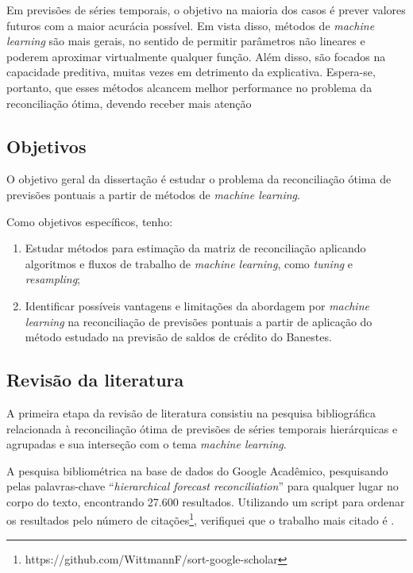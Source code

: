 \documentclass[
  12pt,
  oneside,
  a4paper,
  chapter=TITLE,
  section=TITLE,
  brazil]{abntex2}
\providecommand{\tightlist}{%
  \setlength{\itemsep}{0pt}\setlength{\parskip}{0pt}}\usepackage{longtable,booktabs,array}
\begin{document}
Em previsões de séries temporais, o objetivo na maioria dos casos é
prever valores futuros com a maior acurácia possível. Em vista disso,
métodos de \emph{machine learning} são mais gerais, no sentido de
permitir parâmetros não lineares e poderem aproximar virtualmente
qualquer função. Além disso, são focados na capacidade preditiva, muitas
vezes em detrimento da explicativa. Espera-se, portanto, que esses
métodos alcancem melhor performance no problema da reconciliação ótima,
devendo receber mais atenção

\hypertarget{objetivos}{%
\subsection{Objetivos}\label{objetivos}}

O objetivo geral da dissertação é estudar o problema da reconciliação
ótima de previsões pontuais a partir de métodos de \emph{machine
learning}.

Como objetivos específicos, tenho:

\begin{enumerate}
\def\labelenumi{\arabic{enumi}.}
\tightlist
\item
  Estudar métodos para estimação da matriz de reconciliação aplicando
  algoritmos e fluxos de trabalho de \emph{machine learning}, como
  \emph{tuning} e \emph{resampling};
\item
  Identificar possíveis vantagens e limitações da abordagem por
  \emph{machine learning} na reconciliação de previsões pontuais a
  partir de aplicação do método estudado na previsão de saldos de
  crédito do Banestes.
\end{enumerate}

\hypertarget{revisuxe3o-da-literatura}{%
\subsection{Revisão da literatura}\label{revisuxe3o-da-literatura}}

A primeira etapa da revisão de literatura consistiu na pesquisa
bibliográfica relacionada à reconciliação ótima de previsões de séries
temporais hierárquicas e agrupadas e sua interseção com o tema
\emph{machine learning}.

A pesquisa bibliométrica na base de dados do Google Acadêmico,
pesquisando pelas palavras-chave ``\emph{hierarchical forecast
reconciliation}'' para qualquer lugar no corpo do texto, encontrando
27.600 resultados. Utilizando um script para ordenar os resultados pelo
número de citações\footnote{https://github.com/WittmannF/sort-google-scholar},
verifiquei que o trabalho mais citado é \textcite{hyndman2021}.
\end{document}
